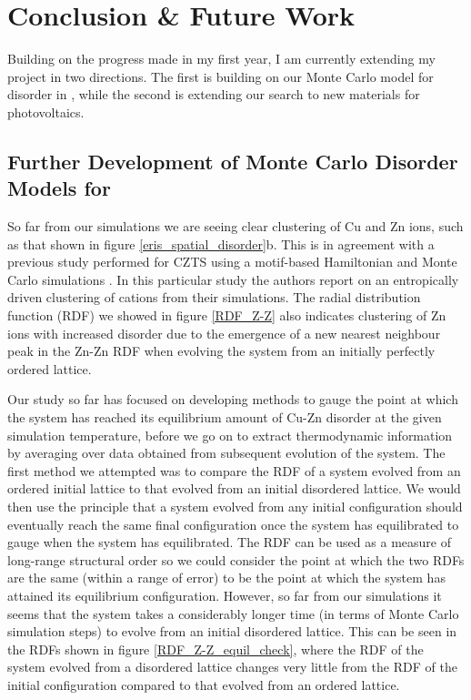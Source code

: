 
\chapter{Conclusion \& Future Work}
\label{ch:conclusions}
Building on the progress made in my first year, I am currently extending my project in two directions. The first is building on our Monte Carlo model for disorder in {\CZTS}, while the second is extending our search to new materials for photovoltaics.

\section{Further Development of Monte Carlo Disorder Models for {\CZTS}}\label{eris_future_work}
So far from our simulations we are seeing clear clustering of Cu and Zn ions, such as that shown in figure \ref{eris_spatial_disorder}b. This is in agreement with a previous study performed for CZTS using a motif-based Hamiltonian and Monte Carlo simulations \cite{Lany_CZTS}. In this particular study the authors report on an entropically driven clustering of cations from their simulations. The radial distribution function (RDF) we showed in figure \ref{RDF_Z-Z} also indicates clustering of Zn ions with increased disorder due to the emergence of a new nearest neighbour peak in the Zn-Zn RDF when evolving the system from an initially perfectly ordered lattice.

Our study so far has focused on developing methods to gauge the point at which the system has reached its equilibrium amount of Cu-Zn disorder at the given simulation temperature, before we go on to extract thermodynamic information by averaging over data obtained from subsequent evolution of the system. The first method we attempted was to compare the RDF of a system evolved from an ordered initial lattice to that evolved from an initial disordered lattice. We would then use the principle that a system evolved from any initial configuration should eventually reach the same final configuration once the system has equilibrated to gauge when the system has equilibrated. The RDF can be used as a measure of long-range structural order so we could consider the point at which the two RDFs are the same (within a range of error) to be the point at which the system has attained its equilibrium configuration. However, so far from our simulations it seems that the system takes a considerably longer time (in terms of Monte Carlo simulation steps) to evolve from an initial disordered lattice. This can be seen in the RDFs shown in figure \ref{RDF_Z-Z_equil_check}, where the RDF of the system evolved from a disordered lattice changes very little from the RDF of the initial configuration compared to that evolved from an ordered lattice. 

